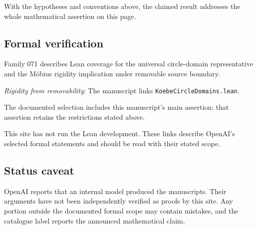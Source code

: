 \documentclass[11pt]{article}
\begin{document}
With the hypotheses and conventions above, the claimed result addresses the whole mathematical assertion on this page.

\subsection{Formal verification}
Family 071 describes Lean coverage for the universal circle-domain representative and the Möbius rigidity implication under removable source boundary.

\textit{Rigidity from removability}: The manuscript links \texttt{KoebeCircleDomains.lean}.

The documented selection includes this manuscript’s main assertion; that assertion retains the restrictions stated above.

This site has not run the Lean development. These links describe OpenAI’s selected formal statements and should be read with their stated scope.

\subsection{Status caveat}
OpenAI reports that an internal model produced the manuscripts. Their arguments have not been independently verified as proofs by this site. Any portion outside the documented formal scope may contain mistakes, and the catalogue label reports the announced mathematical claim.
\end{document}
